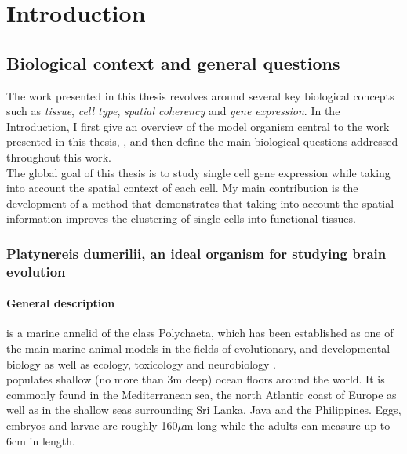 %
\chapter{Introduction}\label{ch:background}
%

\section{Biological context and general questions}
	
	The work presented in this thesis revolves around several key biological concepts such as \emph{tissue}, \emph{cell type}, \emph{spatial coherency} and \emph{gene expression}. In the Introduction, I first give an overview of the model organism central to the work presented in this thesis, \platyfull{}, and then define the main biological questions addressed throughout this work.\\
	
	The global goal of this thesis is to study single cell gene expression while taking into account the spatial context of each cell. My main contribution is the development of a method that demonstrates that taking into account the spatial information improves the clustering of single cells into functional tissues.\\
	
	\subsection{Platynereis dumerilii, an ideal organism for studying brain evolution}\label{sec:platynereis}
    	 \subsubsection{General description}
     \platyfull{} is a marine annelid of the class Polychaeta, which has been established as one of the main marine animal models in the fields of evolutionary, and developmental biology as well as ecology, toxicology and neurobiology \citep{hutchinson95,tessmar03,hardege99,dorresteijn90,fischer04,Fischer10}.\\
     
     \platy{} populates shallow (no more than 3m deep) ocean floors around the world. It is commonly found in the Mediterranean sea, the north Atlantic coast of Europe as well as in the shallow seas surrounding Sri Lanka, Java and the Philippines. Eggs, embryos and larvae are roughly 160$\mu$m long while the adults can measure up to 6cm in length.
     
